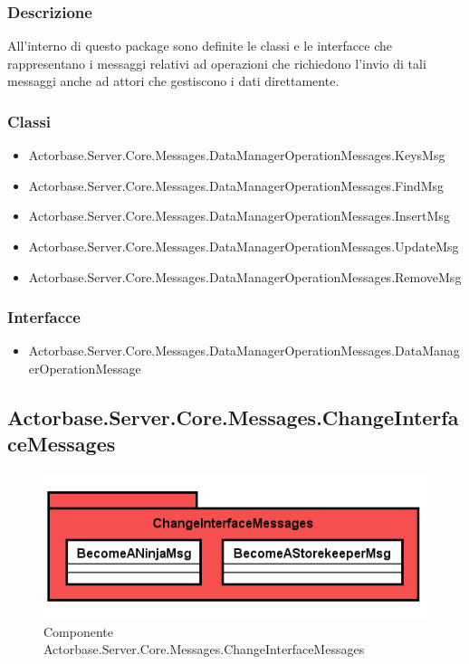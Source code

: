 \documentclass[a4paper]{article}
\begin{document}
			\subsubsection{Descrizione}
				All'interno di questo package sono definite le classi e le interfacce che rappresentano i messaggi relativi ad operazioni che richiedono l'invio di tali messaggi anche ad attori che gestiscono i dati direttamente.
			\subsubsection{Classi}
			\begin{itemize}
				\item Actorbase.Server.Core.Messages.DataManagerOperationMessages.KeysMsg
				\item Actorbase.Server.Core.Messages.DataManagerOperationMessages.FindMsg
				\item Actorbase.Server.Core.Messages.DataManagerOperationMessages.InsertMsg
				\item Actorbase.Server.Core.Messages.DataManagerOperationMessages.UpdateMsg
				\item Actorbase.Server.Core.Messages.DataManagerOperationMessages.RemoveMsg
			\end{itemize}
			\subsubsection{Interfacce}
			\begin{itemize}
				\item Actorbase.Server.Core.Messages.DataManagerOperationMessages.DataManagerOperationMessage
			\end{itemize}
			
			\subsection{Actorbase.Server.Core.Messages.ChangeInterfaceMessages}
			\begin{figure} [H]
			\centering
			\includegraphics[scale=0.65]{Server/Package/ChangeInterfaceMessagesLevel.png}
			\caption{Componente Actorbase.Server.Core.Messages.ChangeInterfaceMessages}
			\end{figure}
\end{document}
